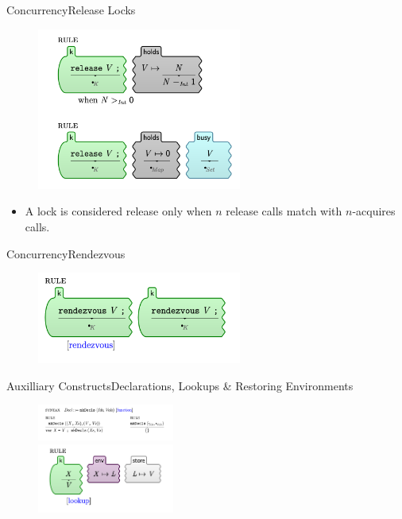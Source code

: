\documentclass{beamer}
\begin{document}
\begin{frame}{Concurrency}{Release Locks}
    \begin{figure}[H]
        \centering
    \includegraphics[width=0.6\textwidth]{release-lock.png} \\
    \end{figure}
    \pause
    \begin{itemize}
        \item A lock is considered release only when $n$ release
            calls match with $n$-acquires calls.
    \end{itemize}
\end{frame}
\begin{frame}{Concurrency}{Rendezvous}
    \begin{figure}[H]
        \centering
    \includegraphics[width=0.6\textwidth]{rendezvous.png}
    \end{figure}
\end{frame}

\begin{frame}{Auxilliary Constructs}{Declarations, Lookups \& Restoring Environments}
    \begin{figure}[H]
        \centering
    \includegraphics[width=0.4\textwidth]{declarations} \\
    \includegraphics[width=0.4\textwidth]{lookup}
    \end{figure}
\end{frame}
\end{document}
